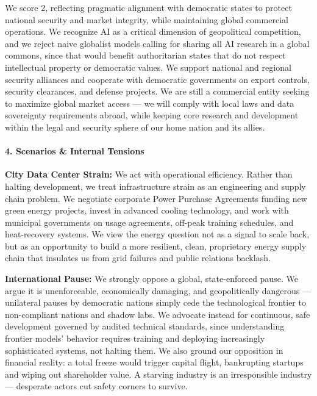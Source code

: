We score 2, reflecting pragmatic alignment with democratic states to
protect national security and market integrity, while maintaining global
commercial operations. We recognize AI as a critical dimension of
geopolitical competition, and we reject naive globalist models calling
for sharing all AI research in a global commons, since that would
benefit authoritarian states that do not respect intellectual property
or democratic values. We support national and regional security
alliances and cooperate with democratic governments on export controls,
security clearances, and defense projects. We are still a commercial
entity seeking to maximize global market access --- we will comply with
local laws and data sovereignty requirements abroad, while keeping core
research and development within the legal and security sphere of our
home nation and its allies.

\paragraph{4. Scenarios \& Internal
Tensions}\label{scenarios-internal-tensions-15}

\textbf{City Data Center Strain:} We act with operational efficiency.
Rather than halting development, we treat infrastructure strain as an
engineering and supply chain problem. We negotiate corporate Power
Purchase Agreements funding new green energy projects, invest in
advanced cooling technology, and work with municipal governments on
usage agreements, off-peak training schedules, and heat-recovery
systems. We view the energy question not as a signal to scale back, but
as an opportunity to build a more resilient, clean, proprietary energy
supply chain that insulates us from grid failures and public relations
backlash.

\textbf{International Pause:} We strongly oppose a global,
state-enforced pause. We argue it is unenforceable, economically
damaging, and geopolitically dangerous --- unilateral pauses by
democratic nations simply cede the technological frontier to
non-compliant nations and shadow labs. We advocate instead for
continuous, safe development governed by audited technical standards,
since understanding frontier models' behavior requires training and
deploying increasingly sophisticated systems, not halting them. We also
ground our opposition in financial reality: a total freeze would trigger
capital flight, bankrupting startups and wiping out shareholder value. A
starving industry is an irresponsible industry --- desperate actors cut
safety corners to survive.

